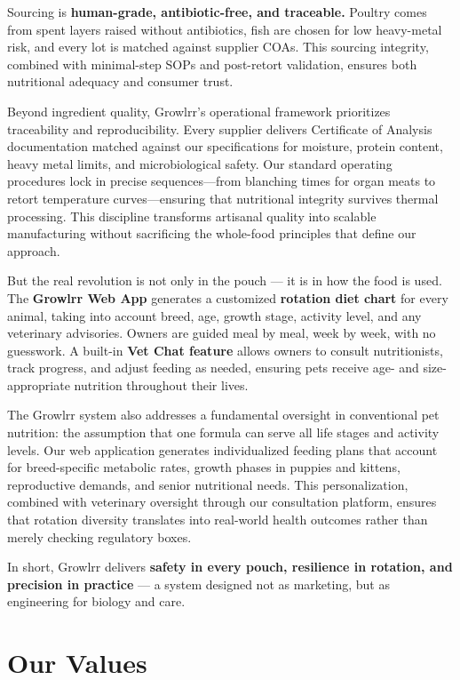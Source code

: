 Sourcing is \textbf{human-grade, antibiotic-free, and traceable.} Poultry comes from spent layers raised without antibiotics, fish are chosen for low heavy-metal risk, and every lot is matched against supplier COAs. This sourcing integrity, combined with minimal-step SOPs and post-retort validation, ensures both nutritional adequacy and consumer trust.

Beyond ingredient quality, Growlrr's operational framework prioritizes traceability and reproducibility. Every supplier delivers Certificate of Analysis documentation matched against our specifications for moisture, protein content, heavy metal limits, and microbiological safety. Our standard operating procedures lock in precise sequences—from blanching times for organ meats to retort temperature curves—ensuring that nutritional integrity survives thermal processing. This discipline transforms artisanal quality into scalable manufacturing without sacrificing the whole-food principles that define our approach.

But the real revolution is not only in the pouch --- it is in how the food is used. The \textbf{Growlrr Web App} generates a customized \textbf{rotation diet chart} for every animal, taking into account breed, age, growth stage, activity level, and any veterinary advisories. Owners are guided meal by meal, week by week, with no guesswork. A built-in \textbf{Vet Chat feature} allows owners to consult nutritionists, track progress, and adjust feeding as needed, ensuring pets receive age- and size-appropriate nutrition throughout their lives.

The Growlrr system also addresses a fundamental oversight in conventional pet nutrition: the assumption that one formula can serve all life stages and activity levels. Our web application generates individualized feeding plans that account for breed-specific metabolic rates, growth phases in puppies and kittens, reproductive demands, and senior nutritional needs. This personalization, combined with veterinary oversight through our consultation platform, ensures that rotation diversity translates into real-world health outcomes rather than merely checking regulatory boxes.

In short, Growlrr delivers \textbf{safety in every pouch, resilience in rotation, and precision in practice} --- a system designed not as marketing, but as engineering for biology and care.

\newpage
\section{Our Values}

